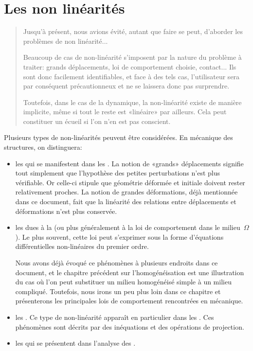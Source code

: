 \chapter{Les non linéarités}\label{Ch-NL}
\begin{abstract}
Jusqu'à présent, nous avions évité, autant que faire se peut, d'aborder les problèmes de non linéarité...

\medskip
Beaucoup de cas de non-linéarité s'imposent par la nature du problème à traiter: grands déplacements, loi de comportement choisie, contact... Ils sont donc facilement identifiables, et face à des tels cas, l'utilisateur sera par conséquent précautionneux et ne se laissera donc pas surprendre.

Toutefois, dans le cas de la dynamique, la non-linéarité existe de manière implicite, même si tout le reste est «linéaire» par ailleurs. Cela peut constituer un écueil si l'on n'en est pas conscient.
\end{abstract}

Plusieurs types de non-linéarités peuvent être considérées. En mécanique des structures, on distinguera:
\begin{itemize}
   \item les  qui se manifestent dans les
	. La notion de «grands» déplacements signifie tout simplement que l'hypothèse des petites perturbations n'est plus vérifiable. Or celle-ci stipule que géométrie déformée et initiale doivent rester relativement proches.
	La notion de grandes déformations, déjà mentionnée dans ce document, fait que la linéarité des relations entre déplacements et déformations n'est plus conservée.

\item les  dues à la  (ou plus généralement à la loi de comportement dans le milieu~$\Omega$).
	Le plus souvent, cette loi peut s'exprimer sous la forme d'équations différentielles non-linéaires du premier ordre.

	Nous avons déjà évoqué ce phénomènes à plusieurs endroits dans ce document,
	et le chapitre précédent sur l'homogénéisation est une illustration du cas où l'on peut
	substituer un milieu homogénéisé simple à un milieu compliqué. Toutefois, nous irons
	un peu plus loin dans ce chapitre et présenterons les principales lois de comportement
	rencontrées en mécanique.

  \item les .
	Ce type de non-linéarité apparaît en particulier dans les .
	Ces phénomènes sont décrits par des inéquations et des opérations de projection.

  \item les  qui se présentent dans
	l'analyse des .
\end{itemize}




